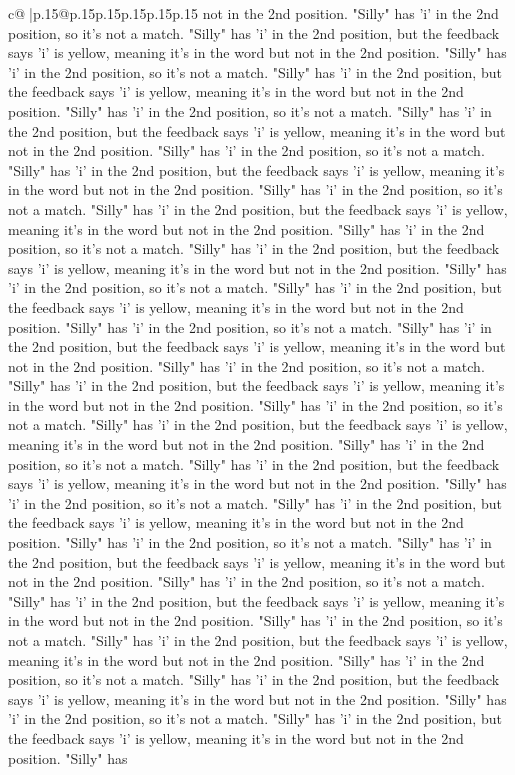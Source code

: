 \documentclass{article}
\begin{document}
{\begin{supertabular}{c@{$\;$}|p{.15\linewidth}@{}p{.15\linewidth}p{.15\linewidth}p{.15\linewidth}p{.15\linewidth}p{.15\linewidth}}
{{{not in the 2nd position. "Silly" has 'i' in the 2nd position, so it's not a match. "Silly" has 'i' in the 2nd position, but the feedback says 'i' is yellow, meaning it's in the word but not in the 2nd position. "Silly" has 'i' in the 2nd position, so it's not a match. "Silly" has 'i' in the 2nd position, but the feedback says 'i' is yellow, meaning it's in the word but not in the 2nd position. "Silly" has 'i' in the 2nd position, so it's not a match. "Silly" has 'i' in the 2nd position, but the feedback says 'i' is yellow, meaning it's in the word but not in the 2nd position. "Silly" has 'i' in the 2nd position, so it's not a match. "Silly" has 'i' in the 2nd position, but the feedback says 'i' is yellow, meaning it's in the word but not in the 2nd position. "Silly" has 'i' in the 2nd position, so it's not a match. "Silly" has 'i' in the 2nd position, but the feedback says 'i' is yellow, meaning it's in the word but not in the 2nd position. "Silly" has 'i' in the 2nd position, so it's not a match. "Silly" has 'i' in the 2nd position, but the feedback says 'i' is yellow, meaning it's in the word but not in the 2nd position. "Silly" has 'i' in the 2nd position, so it's not a match. "Silly" has 'i' in the 2nd position, but the feedback says 'i' is yellow, meaning it's in the word but not in the 2nd position. "Silly" has 'i' in the 2nd position, so it's not a match. "Silly" has 'i' in the 2nd position, but the feedback says 'i' is yellow, meaning it's in the word but not in the 2nd position. "Silly" has 'i' in the 2nd position, so it's not a match. "Silly" has 'i' in the 2nd position, but the feedback says 'i' is yellow, meaning it's in the word but not in the 2nd position. "Silly" has 'i' in the 2nd position, so it's not a match. "Silly" has 'i' in the 2nd position, but the feedback says 'i' is yellow, meaning it's in the word but not in the 2nd position. "Silly" has 'i' in the 2nd position, so it's not a match. "Silly" has 'i' in the 2nd position, but the feedback says 'i' is yellow, meaning it's in the word but not in the 2nd position. "Silly" has 'i' in the 2nd position, so it's not a match. "Silly" has 'i' in the 2nd position, but the feedback says 'i' is yellow, meaning it's in the word but not in the 2nd position. "Silly" has 'i' in the 2nd position, so it's not a match. "Silly" has 'i' in the 2nd position, but the feedback says 'i' is yellow, meaning it's in the word but not in the 2nd position. "Silly" has 'i' in the 2nd position, so it's not a match. "Silly" has 'i' in the 2nd position, but the feedback says 'i' is yellow, meaning it's in the word but not in the 2nd position. "Silly" has 'i' in the 2nd position, so it's not a match. "Silly" has 'i' in the 2nd position, but the feedback says 'i' is yellow, meaning it's in the word but not in the 2nd position. "Silly" has 'i' in the 2nd position, so it's not a match. "Silly" has 'i' in the 2nd position, but the feedback says 'i' is yellow, meaning it's in the word but not in the 2nd position. "Silly" has 'i' in the 2nd position, so it's not a match. "Silly" has 'i' in the 2nd position, but the feedback says 'i' is yellow, meaning it's in the word but not in the 2nd position. "Silly" has }}}
\end{supertabular}}
\end{document}
